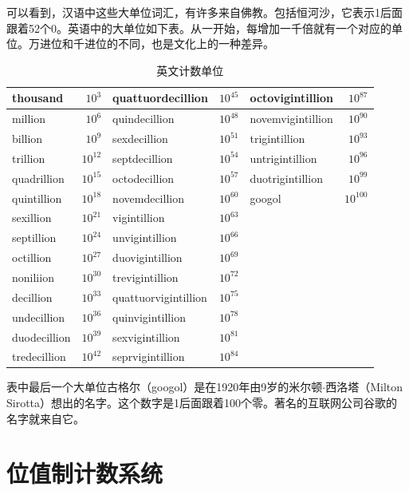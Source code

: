 \documentclass[b5paper]{ctexart}
\begin{document}
可以看到，汉语中这些大单位词汇，有许多来自佛教\cite{Noguchi2007}。包括恒河沙，它表示1后面跟着52个0。英语中的大单位如下表。从一开始，每增加一千倍就有一个对应的单位。万进位和千进位的不同，也是文化上的一种差异。

\begin{table}[htbp]
  \centering
  \begin{tabular}{|l|r|l|r|l|r|}
  \hline
  thousand & $10^{3}$ & quattuordecillion & $10^{45}$ & octovigintillion & $10^{87}$ \\
  \hline
  million & $10^{6}$ & quindecillion & $10^{48}$ & novemvigintillion & $10^{90}$ \\
  \hline
  billion & $10^{9}$ & sexdecillion & $10^{51}$ & trigintillion & $10^{93}$ \\
  \hline
  trillion  & $10^{12}$ & septdecillion & $10^{54}$ & untrigintillion & $10^{96}$ \\
  \hline
  quadrillion  & $10^{15}$ & octodecillion & $10^{57}$ & duotrigintillion & $10^{99}$ \\
  \hline
  quintillion  & $10^{18}$ & novemdecillion & $10^{60}$ & googol & $10^{100}$ \\
  \hline
  sexillion    & $10^{21}$ & vigintillion & $10^{63}$ & & \\
  \hline
  septillion   & $10^{24}$ & unvigintillion & $10^{66}$ & & \\
  \hline
  octillion    & $10^{27}$ & duovigintillion & $10^{69}$ & & \\
  \hline
  noniliion  & $10^{30}$ & trevigintillion & $10^{72}$ & & \\
  \hline
  decillion  & $10^{33}$ & quattuorvigintillion & $10^{75}$ & & \\
  \hline
  undecillion   & $10^{36}$ & quinvigintillion & $10^{78}$ & & \\
  \hline
  duodecillion  & $10^{39}$ & sexvigintillion & $10^{81}$ & & \\
  \hline
  tredecillion  & $10^{42}$ & seprvigintillion & $10^{84}$ & & \\
  \hline
  \end{tabular}
  \caption{英文计数单位}
  \label{tab:units-en}
\end{table}

表中最后一个大单位古格尔（googol）是在1920年由9岁的米尔顿$\cdot$西洛塔（Milton Sirotta）想出的名字。这个数字是1后面跟着100个零。著名的互联网公司谷歌的名字就来自它。

\section{位值制计数系统}
  
\end{document}
